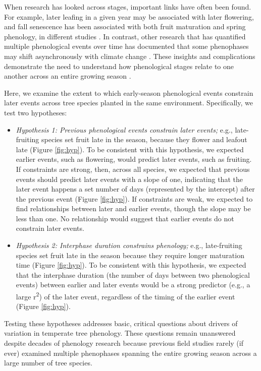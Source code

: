 \documentclass{article}
\begin{document}
\par When research has looked across stages, important links have often been found. For example, later leafing in a given year may be associated with later flowering, and fall senescence has been associated with both fruit maturation and spring phenology, in different studies \citep{lechowicz1995,keenan2015,liu2016}. In contrast, other research that has quantified multiple phenological events over time has documented that some phenophases may shift asynchronously with climate change \citep[e.g., spring events are occurring earlier as fall events have gotten later, first-flower dates have shifted earlier whereas last-flower dates have not,][]{menzel2006,caradonna2014}. These insights and complications demonstrate the need to understand how phenological stages relate to one another across an entire growing season \citep{wolkovich2014}.

\par Here, we examine the extent to which early-season phenological events constrain later events across tree species planted in the same environment. Specifically, we test two hypotheses:
\begin{itemize}
\item \textit{Hypothesis 1: Previous phenological events constrain later events;} e.g., late-fruiting species set fruit late in the season, because they flower and leafout late (Figure \ref{fig:hyp}). To be consistent with this hypothesis, we expected earlier events, such as flowering, would predict later events, such as fruiting. If constraints are strong, then, across all species, we expected that previous events should predict later events with a slope of one, indicating that the later event happens a set number of days (represented by the intercept) after the previous event (Figure \ref{fig:hyp}). If constraints are weak, we expected to find relationships between later and earlier events, though the slope may be less than one. No relationship would suggest that earlier events do not constrain later events.

\item \textit{Hypothesis 2: Interphase duration constrains phenology;} e.g., late-fruiting species set fruit late in the season because they require longer maturation time (Figure \ref{fig:hyp}). To be consistent with this hypothesis, we expected that the interphase duration (the number of days between two phenological events) between earlier and later events would be a strong predictor (e.g., a large r\textsuperscript{2}) of the later event, regardless of the timing of the earlier event (Figure \ref{fig:hyp}). 
\end{itemize}
Testing these hypotheses addresses basic, critical questions about drivers of variation in temperate tree phenology. These questions remain unanswered despite decades of phenology research because previous field studies rarely (if ever) examined multiple phenophases spanning the entire growing season across a large number of tree species. 
\end{document}
